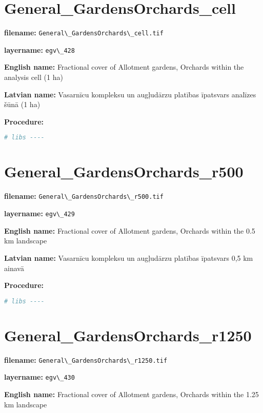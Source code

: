 \documentclass[
]{book}
\newcommand{\passthrough}[1]{#1}
\begin{document}
\section{General\_GardensOrchards\_cell}\label{ch06.428}

\textbf{filename:} \passthrough{\lstinline!General\_GardensOrchards\_cell.tif!}

\textbf{layername:} \passthrough{\lstinline!egv\_428!}

\textbf{English name:} Fractional cover of Allotment gardens, Orchards within the analysis cell (1 ha)

\textbf{Latvian name:} Vasarnīcu kompleksu un augļudārzu platības īpatsvars analīzes šūnā (1 ha)

\textbf{Procedure:}

\begin{lstlisting}[language=R]
# libs ----
\end{lstlisting}

\section{General\_GardensOrchards\_r500}\label{ch06.429}

\textbf{filename:} \passthrough{\lstinline!General\_GardensOrchards\_r500.tif!}

\textbf{layername:} \passthrough{\lstinline!egv\_429!}

\textbf{English name:} Fractional cover of Allotment gardens, Orchards within the 0.5 km landscape

\textbf{Latvian name:} Vasarnīcu kompleksu un augļudārzu platības īpatsvars 0,5 km ainavā

\textbf{Procedure:}

\begin{lstlisting}[language=R]
# libs ----
\end{lstlisting}

\section{General\_GardensOrchards\_r1250}\label{ch06.430}

\textbf{filename:} \passthrough{\lstinline!General\_GardensOrchards\_r1250.tif!}

\textbf{layername:} \passthrough{\lstinline!egv\_430!}

\textbf{English name:} Fractional cover of Allotment gardens, Orchards within the 1.25 km landscape
\end{document}
